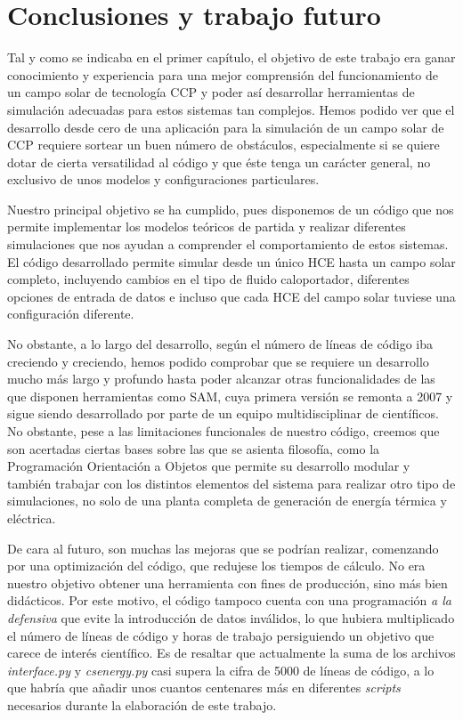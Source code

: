 \chapter{Conclusiones y trabajo futuro}
\label{conclusiones}

Tal y como se indicaba en el primer capítulo, el objetivo de este trabajo era ganar conocimiento y experiencia para una mejor comprensión del funcionamiento de un campo solar de tecnología CCP y poder así desarrollar herramientas de simulación adecuadas para estos sistemas tan complejos.  Hemos podido ver que el desarrollo desde cero de una aplicación para la simulación de un campo solar de CCP requiere sortear un buen número de obstáculos, especialmente si se quiere dotar de cierta versatilidad al código y que éste tenga un carácter general, no exclusivo de unos modelos y configuraciones particulares.

Nuestro principal objetivo se ha cumplido, pues disponemos de un código que nos permite implementar los modelos teóricos de partida y realizar diferentes simulaciones que nos ayudan a comprender el comportamiento de estos sistemas. El código desarrollado permite simular desde un único HCE hasta un campo solar completo, incluyendo cambios en el tipo de fluido caloportador, diferentes opciones de entrada de datos e incluso que cada HCE del campo solar tuviese una configuración diferente.

No obstante, a lo largo del desarrollo, según el número de líneas de código iba creciendo y creciendo, hemos podido comprobar que se requiere un desarrollo mucho más largo y profundo hasta poder alcanzar otras funcionalidades de las que disponen herramientas como SAM, cuya primera versión se remonta a 2007 y sigue siendo desarrollado por parte de un equipo multidisciplinar de científicos. No obstante, pese a las limitaciones funcionales de nuestro código, creemos que son acertadas ciertas bases sobre las que se asienta filosofía, como la Programación Orientación a Objetos que permite su desarrollo modular y también trabajar con los distintos elementos del sistema para realizar otro tipo de simulaciones, no solo de una planta completa de generación de energía térmica y eléctrica.

De cara al futuro, son muchas las mejoras que se podrían realizar, comenzando por una optimización del código, que redujese los tiempos de cálculo. No era nuestro objetivo obtener una herramienta con fines de producción, sino más bien didácticos. Por este motivo, el código tampoco cuenta con una programación \emph{a la defensiva} que evite la introducción de datos inválidos, lo que hubiera multiplicado el número de líneas de código y horas de trabajo persiguiendo un objetivo que carece de interés científico. Es de resaltar que  actualmente la suma de los archivos \emph{interface.py} y \emph{csenergy.py} casi supera la cifra de 5000 de líneas de código, a lo que habría que añadir unos cuantos centenares más en diferentes \emph{scripts} necesarios durante la elaboración de este trabajo.

